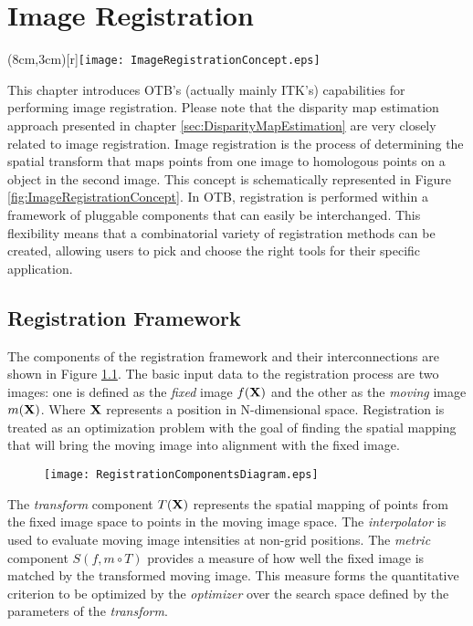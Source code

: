 \chapter{Image Registration}
\label{chap:ImageRegistration}
\parpic(8cm,3cm)[r]{\texttt{[image: ImageRegistrationConcept.eps]}}
  
This chapter introduces OTB's (actually mainly ITK's) capabilities for performing image
registration. Please note that the disparity map estimation approach
presented in chapter \ref{sec:DisparityMapEstimation} are very closely
related to image registration. Image registration is the process of
determining the spatial transform that maps points from one image to
homologous points on a object in the second image. This concept is
schematically represented in Figure
\ref{fig:ImageRegistrationConcept}. In OTB, registration is performed
within a framework of pluggable components that can easily be
interchanged.  This flexibility means that a combinatorial variety of
registration methods can be created, allowing users to pick and choose
the right tools for their specific application.


\section{Registration Framework}
The components of the registration framework and their interconnections are
shown in Figure \ref{fig:RegistrationComponents}. The basic input data to the
registration process are two images: one is defined as the \emph{fixed} image
$f(\bf{X})$ and the other as the \emph{moving} image $m(\bf{X})$. Where
$\bf{X}$ represents a position in N-dimensional space. Registration is treated
as an optimization problem with the goal of finding the spatial mapping that
will bring the moving image into alignment with the fixed image.

\begin{figure}
\center
\texttt{[image: RegistrationComponentsDiagram.eps]}
\label{fig:RegistrationComponents}
\end{figure}

The \emph{transform} component $T(\bf{X})$ represents the spatial mapping of
points from the fixed image space to points in the moving image space. The
\emph{interpolator} is used to evaluate moving image intensities at non-grid
positions. The \emph{metric} component $S(f,m \circ T)$ provides a measure of
how well the fixed image is matched by the transformed moving image. This
measure forms the quantitative criterion to be optimized by the
\emph{optimizer} over the search space defined by the parameters of the
\emph{transform}.

